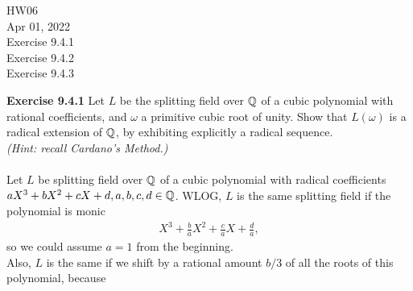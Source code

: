 \documentclass{article}
\begin{document}
\maketitle
HW06 \\
Apr 01, 2022 \\
Exercise 9.4.1\\
Exercise 9.4.2\\
Exercise 9.4.3\\
\pagebreak

\begin{homeworkProblem}
    \textbf{Exercise 9.4.1} Let $L$ be the splitting field over $\mathbb{Q}$ of a cubic polynomial with rational coefficients,
    and $\omega$ a primitive cubic root of unity. Show that $L(\omega)$ is a radical extension of $\mathbb{Q}$, by exhibiting explicitly a radical sequence.\\
    \textit{(Hint: recall Cardano's Method.)}\\
    \solution \\
    Let $L$ be splitting field over $\mathbb{Q}$ of a cubic polynomial with radical coefficients $aX^3 + bX^2 + cX + d, a,b,c,d \in \mathbb{Q}$.
    WLOG, $L$ is the same splitting field if the polynomial is monic
    \begin{align}
        X^3 + \frac{ b }{ a }X^2 + \frac{ c }{ a }X + \frac{ d }{ a }, 
    \end{align}
    so we could assume $a=1$ from the beginning.\\
    Also, $L$ is the same if we shift by a rational amount $b/3$ of all the roots of this polynomial, because

    



\end{homeworkProblem}

\pagebreak
\end{document}
